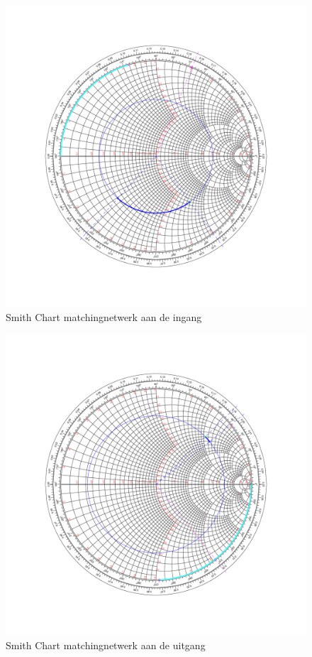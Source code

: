   \begin{figure}[!htp]
    \centering
    \includegraphics[width=\textwidth,keepaspectratio=true]{fig/matchSource.pdf}
    \caption{Smith Chart matchingnetwerk aan de ingang}
    \label{fig:matchIn}
  \end{figure}

  \begin{figure}[!hbp]
    \centering
    \includegraphics[width=\textwidth,keepaspectratio=true]{fig/matchLoad.pdf}
    \caption{Smith Chart matchingnetwerk aan de uitgang}
    \label{fig:matchOut}
  \end{figure}
  
